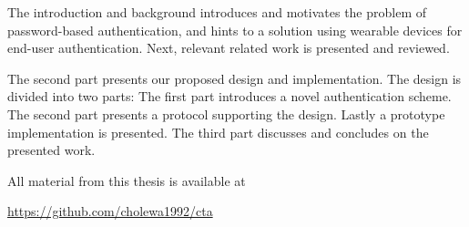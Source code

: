 The introduction and background introduces and motivates the problem of password-based authentication, and hints to a solution using wearable devices for end-user authentication. Next, relevant related work is presented and reviewed.

The second part presents our proposed design and implementation. The design is divided into two parts: The first part introduces a novel authentication scheme. The second part presents a protocol supporting the design. Lastly a prototype implementation is presented. The third part discusses and concludes on the presented work.

\vfill

\noindent All material from this thesis is available at
\begin{center}
\url{https://github.com/cholewa1992/cta}
\end{center}

\vfill




